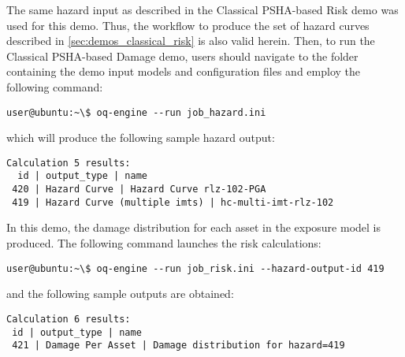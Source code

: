 The same hazard input as described in the Classical PSHA-based Risk demo was
used for this demo. Thus, the workflow to produce the set of hazard curves
described in \ref{sec:demos_classical_risk} is also valid herein. Then, to run
the Classical PSHA-based Damage demo, users should navigate to the folder
containing the demo input models and configuration files and employ the
following command:

\begin{Verbatim}[frame=single, commandchars=\\\{\}, samepage=true]
user@ubuntu:~\$ oq-engine --run job_hazard.ini
\end{Verbatim}

which will produce the following sample hazard output:

\begin{Verbatim}[frame=single, commandchars=\\\{\}, samepage=true]
Calculation 5 results:
  id | output_type | name
 420 | Hazard Curve | Hazard Curve rlz-102-PGA
 419 | Hazard Curve (multiple imts) | hc-multi-imt-rlz-102
\end{Verbatim}

In this demo, the damage distribution for each asset in the exposure model is
produced. The following command launches the risk calculations:

\begin{Verbatim}[frame=single, commandchars=\\\{\}, samepage=true]
user@ubuntu:~\$ oq-engine --run job_risk.ini --hazard-output-id 419
\end{Verbatim}

and the following sample outputs are obtained:

\begin{Verbatim}[frame=single, commandchars=\\\{\}, samepage=true]
Calculation 6 results:
 id | output_type | name
 421 | Damage Per Asset | Damage distribution for hazard=419
\end{Verbatim}